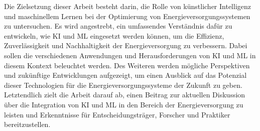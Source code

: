 Die Zielsetzung dieser Arbeit besteht darin, die Rolle von künstlicher
Intelligenz und maschinellem Lernen bei der Optimierung von
Energieversorgungssystemen zu untersuchen. Es wird angestrebt, ein umfassendes
Verständnis dafür zu entwickeln, wie KI und ML eingesetzt werden können, um die
Effizienz, Zuverlässigkeit und Nachhaltigkeit der Energieversorgung zu
verbessern. Dabei sollen die verschiedenen Anwendungen und Herausforderungen
von KI und ML in diesem Kontext beleuchtet werden. Des Weiteren werden mögliche
Perspektiven und zukünftige Entwicklungen aufgezeigt, um einen Ausblick auf das
Potenzial dieser Technologien für die Energieversorgungssysteme der Zukunft zu
geben. Letztendlich zielt die Arbeit darauf ab, einen Beitrag zur aktuellen
Diskussion über die Integration von KI und ML in den Bereich der
Energieversorgung zu leisten und Erkenntnisse für Entscheidungsträger, Forscher
und Praktiker bereitzustellen.
